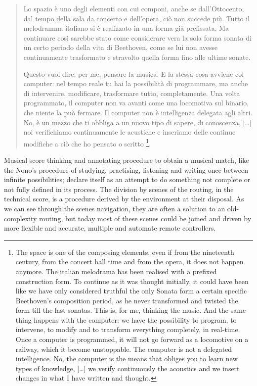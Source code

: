 \documentclass[twoside,a4paper]{article}
\begin{document}
\begin{quote}
Lo spazio è uno degli elementi con cui componi, anche se dall'Ottocento, dal tempo
della sala da concerto e dell'opera, ciò non succede più.
Tutto il melodramma italiano si è realizzato in una forma già prefissata. Ma
continuare così sarebbe stato come considerare vera la sola forma sonata di un
certo periodo della vita di Beethoven, come se lui non avesse continuamente
trasformato e stravolto quella forma fino alle ultime sonate.

Questo vuol dire, per me, pensare la musica. E la stessa cosa avviene col computer:
nel tempo reale tu hai la possibilità di programmare, ma anche di intervenire,
modificare, trasformare tutto, completamente. Una volta programmato, il computer
non va avanti come una locomotiva sul binario, che niente la può fermare. Il
computer non è intelligenza delegata agli altri. No, è un mezzo che ti obbliga a
un nuovo tipo di sapere, di conoscenza, [\ldots] %
noi verifichiamo continuamente le acustiche e inseriamo delle continue modifiche
a ciò che ho pensato o scritto \cite{nono84}\footnote{The space is one of the
composing elements, even if from the nineteenth century, from the concert hall
time and from the opera, it does not happen anymore. The italian melodrama has
been realised with a prefixed construction form. To continue as it was thought
initially, it could have been like we have only considered truthful the only
Sonata form a certain specific Beethoven's composition period, as he never
transformed and twisted the form till the last sonatas. This is, for me,
thinking the music. And the same thing happens with the computer: we have the
possibility to program, to intervene, to modify and to transform everything
completely, in real-time. Once a computer is programmed, it will not go forward
as a locomotive on a railway, which it become unstoppable. The computer is not a
delegated intelligence. No, the computer is the means that obliges you to learn
new types of knowledge, [\ldots] we verify continuously the acoustics and we
insert changes in what I have written and thought.}.
\end{quote}

Musical score thinking and annotating procedure to obtain a musical match, like
the Nono's procedure of studying, practising, listening and writing once between
infinite possibilities; declare itself as an attempt to do something not complete
or not fully defined in its process. The division by scenes of the routing, in
the technical score, is a procedure derived by the environment at their disposal.
As we can see through the scenes navigation, they are often a solution to an
old-complexity routing, but today most of these scenes could be joined and driven
by more flexible and accurate, multiple and automate remote controllers.
\end{document}
